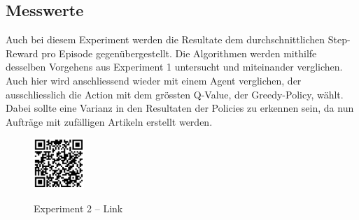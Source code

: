 \subsection{Messwerte}
Auch bei diesem Experiment werden die Resultate dem durchschnittlichen Step-Reward pro Episode gegenübergestellt. Die Algorithmen werden mithilfe desselben Vorgehens aus Experiment 1 untersucht und miteinander verglichen. Auch hier wird anschliessend wieder mit einem Agent verglichen, der ausschliesslich die Action mit dem grössten Q-Value, der Greedy-Policy, wählt. Dabei sollte eine Varianz in den Resultaten der Policies zu erkennen sein, da nun Aufträge mit zufälligen Artikeln erstellt werden.
\smallskip\\
\begin{figure}[hb]
  \centering
  \href{https://github.com/benji24290/rl-warehouse/tree/experiment_2}{\includegraphics[height=1.9cm]{img/qr/qrcode_exp2.jpeg}}
  \caption{Experiment 2 – Link}
\end{figure}


